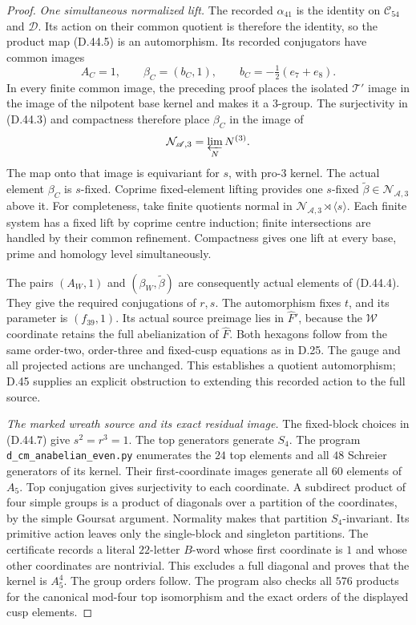 \begin{proof}
\emph{One simultaneous normalized lift.}
The recorded \(\alpha_{41}\) is the identity
on \(\mathcal C_{54}\) and \(\mathcal D\).
Its action on their common quotient is
therefore the identity, so the product
map (D.44.5) is an automorphism.
Its recorded conjugators have common images
\[
       A_C=1,\qquad \beta_C=(b_C,1),\qquad
                    b_C=-\tfrac12(e_7+e_8).                   \tag{D.44.11}
\]
In every finite common image, the preceding
proof places the isolated \(\mathcal T'\)
image in the image of the nilpotent base
kernel and makes it a \(3\)-group.
The surjectivity in (D.44.3) and compactness
therefore place \(\beta_C\) in the image of
\[
                    \mathcal N_{\mathscr A,3}
                             =\varprojlim_N N^{(3)}.
\]
The map onto that image is equivariant
for \(s\), with pro-\(3\) kernel.
The actual element \(\beta_C\) is
\(s\)-fixed. Coprime fixed-element lifting
provides one \(s\)-fixed
\(\widetilde\beta\in\mathcal N_{\mathscr A,3}\)
above it. For completeness, take finite
quotients normal in
\(\mathcal N_{\mathscr A,3}\rtimes\langle s\rangle\).
Each finite system has a fixed lift by
coprime centre induction; finite
intersections are handled by their common
refinement. Compactness gives one lift
at every base, prime and homology level
simultaneously.

The pairs \((A_W,1)\) and
\((\beta_W,\widetilde\beta)\) are consequently
actual elements of (D.44.4). They give
the required conjugations of \(r,s\).
The automorphism fixes \(t\), and its
parameter is \((f_{39},1)\). Its actual
source preimage lies in \(\widehat F'\),
because the \(\mathcal W\) coordinate
retains the full abelianization of
\(\widehat F\). Both hexagons follow
from the same order-two, order-three
and fixed-cusp equations as in D.25.
The gauge and all projected actions
are unchanged. This establishes a
quotient automorphism; D.45 supplies
an explicit obstruction to extending
this recorded action to the full source.

\emph{The marked wreath source and its exact residual image.}
The fixed-block choices in (D.44.7)
give \(s^2=r^3=1\). The top generators
generate \(S_4\). The program
\texttt{d\_cm\_anabelian\_even.py}
enumerates the \(24\) top elements
and all \(48\) Schreier generators
of its kernel. Their first-coordinate
images generate all \(60\) elements
of \(A_5\). Top conjugation gives
surjectivity to each coordinate.
A subdirect product of four simple
groups is a product of diagonals
over a partition of the coordinates,
by the simple Goursat argument.
Normality makes that partition
\(S_4\)-invariant. Its primitive
action leaves only the single-block
and singleton partitions.
The certificate records a literal
\(22\)-letter \(B\)-word whose
first coordinate is \(1\) and
whose other coordinates are nontrivial.
This excludes a full diagonal and
proves that the kernel is \(A_5^4\).
The group orders follow.
The program also checks all \(576\)
products for the canonical mod-four
top isomorphism and the exact orders
of the displayed cusp elements.


\end{proof}
